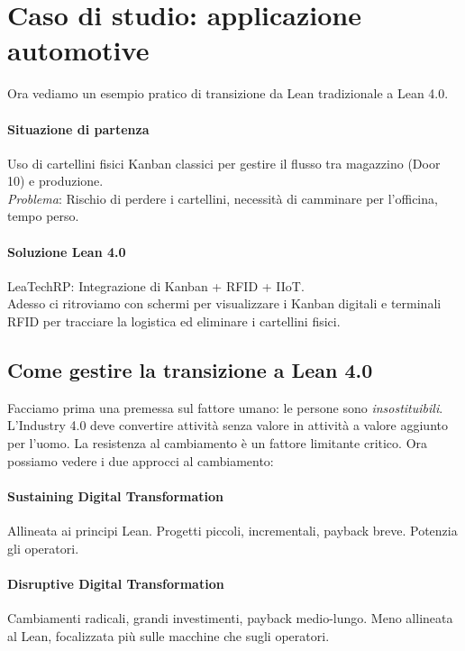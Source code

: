 %
\section{Caso di studio: applicazione automotive}
Ora vediamo un esempio pratico di transizione da Lean tradizionale a Lean 4.0.
%
\paragraph{Situazione di partenza} Uso di cartellini fisici Kanban classici per gestire il flusso tra magazzino (Door 10) e produzione.\\
\emph{Problema}: Rischio di perdere i cartellini, necessità di camminare per l'officina, tempo perso.
%
\paragraph{Soluzione Lean 4.0} LeaTechRP: Integrazione di Kanban + RFID + IIoT. \\
Adesso ci ritroviamo con schermi per visualizzare i Kanban digitali e terminali RFID per tracciare la logistica ed eliminare i cartellini fisici.
%
\subsection{Come gestire la transizione a Lean 4.0}
Facciamo prima una premessa sul fattore umano: le persone sono \emph{insostituibili}. L'Industry 4.0 deve convertire attività senza valore in attività a valore aggiunto per l'uomo. La resistenza al cambiamento è un fattore limitante critico.
Ora possiamo vedere i due approcci al cambiamento:
%
\paragraph{Sustaining Digital Transformation} Allineata ai principi Lean. Progetti piccoli, incrementali, payback breve. Potenzia gli operatori.
%
\paragraph{Disruptive Digital Transformation} Cambiamenti radicali, grandi investimenti, payback medio-lungo. Meno allineata al Lean, focalizzata più sulle macchine che sugli operatori.